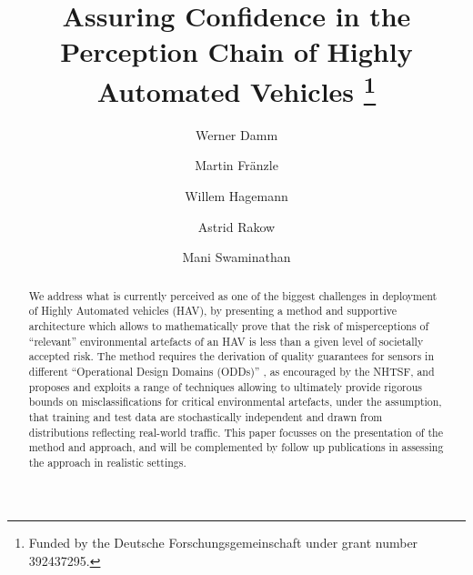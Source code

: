 \documentclass[runningheads]{llncs}
\begin{document}
%
\title{Assuring Confidence in the Perception Chain of Highly Automated Vehicles
\thanks{Funded by the Deutsche Forschungsgemeinschaft under grant number 392437295.}}
%
%
\author{Werner Damm \and
Martin Fr\"anzle  \and
Willem Hagemann  \and
Astrid Rakow  \and
Mani Swaminathan }
%
%
%
\maketitle              %
%
\begin{abstract}
We address what is currently perceived as one of the biggest challenges in deployment of Highly Automated vehicles (HAV), by presenting a method and supportive architecture which allows to mathematically prove that the risk of misperceptions of \enquote{relevant} environmental artefacts of an HAV is less than a given level of societally accepted risk. The method requires the derivation of quality guarantees for sensors in different \enquote{Operational Design Domains (ODDs)} \cite{NHTSF}, as encouraged by the NHTSF, and proposes and exploits a range of techniques allowing to ultimately provide rigorous bounds on misclassifications for critical environmental artefacts, under the assumption, that training and test data are stochastically independent and drawn from distributions reflecting real-world traffic. This paper focusses on the presentation of the method and approach, and will be complemented by follow up publications in assessing the approach in realistic settings.
\end{abstract}
%
%









\end{document}
